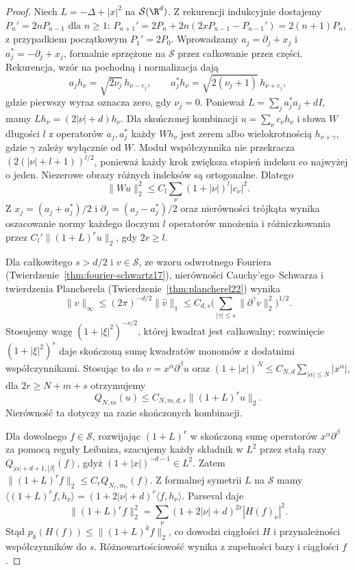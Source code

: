 \begin{proof}
Niech $L=-\Delta+|x|^2$ na $\mathcal S(\R^d)$.
Z rekurencji indukcyjnie dostajemy $P_n'=2nP_{n-1}$ dla $n\ge1$:
$P_{n+1}'=2P_n+2n(2xP_{n-1}-P_{n-1}')=2(n+1)P_n$,
z przypadkiem początkowym $P_1'=2P_0$.
Wprowadzamy $a_j=\partial_j+x_j$ i $a_j^*=-\partial_j+x_j$,
formalnie sprzężone na $\mathcal S$ przez całkowanie przez części.
Rekurencja, wzór na pochodną i normalizacja dają
\[
 a_jh_\nu=\sqrt{2\nu_j}\,h_{\nu-e_j},\qquad
 a_j^*h_\nu=\sqrt{2(\nu_j+1)}\,h_{\nu+e_j},
\]
gdzie pierwszy wyraz oznacza zero, gdy $\nu_j=0$.
Ponieważ $L=\sum_j a_j^*a_j+dI$, mamy
$Lh_\nu=(2|\nu|+d)h_\nu$.
Dla skończonej kombinacji $u=\sum_\nu c_\nu h_\nu$
i słowa $W$ długości $l$ z operatorów $a_j,a_j^*$
każdy $Wh_\nu$ jest zerem albo wielokrotnością
$h_{\nu+\gamma}$, gdzie $\gamma$ zależy wyłącznie od $W$.
Moduł współczynnika nie przekracza
$(2(|\nu|+l+1))^{l/2}$, ponieważ każdy krok zwiększa
stopień indeksu co najwyżej o jeden.
Niezerowe obrazy różnych indeksów są ortogonalne.
Dlatego
\[
 \|Wu\|_2^2\le C_l\sum_\nu(1+|\nu|)^l|c_\nu|^2.
\]
Z $x_j=(a_j+a_j^*)/2$ i $\partial_j=(a_j-a_j^*)/2$
oraz nierówności trójkąta wynika oszacowanie normy
każdego iloczynu $l$ operatorów mnożenia i różniczkowania
przez $C_l'\|(1+L)^r u\|_2$, gdy $2r\ge l$.

Dla całkowitego $s>d/2$ i $v\in\mathcal S$, ze wzoru
odwrotnego Fouriera (Twierdzenie~\ref{thm:fourier-schwartz17}),
nierówności Cauchy'ego--Schwarza i twierdzenia
Plancherela (Twierdzenie~\ref{thm:plancherel22}) wynika
\[
 \|v\|_\infty\le (2\pi)^{-d/2}\|\widehat v\|_1
 \le C_{d,s}\Big(\sum_{|\gamma|\le s}
 \|\partial^\gamma v\|_2^2\Big)^{1/2}.
\]
Stosujemy wagę $(1+|\xi|^2)^{-s/2}$, której kwadrat
jest całkowalny; rozwinięcie $(1+|\xi|^2)^s$ daje
skończoną sumę kwadratów monomów z dodatnimi współczynnikami.
Stosując to do $v=x^\alpha\partial^\beta u$ oraz
$(1+|x|)^N\le C_{N,d}\sum_{|\alpha|\le N}|x^\alpha|$,
dla $2r\ge N+m+s$ otrzymujemy
\[
 Q_{N,m}(u)\le C_{N,m,d,s}\|(1+L)^r u\|_2.
\]
Nierówność ta dotyczy na razie skończonych kombinacji.

Dla dowolnego $f\in\mathcal S$, rozwijając $(1+L)^r$
w skończoną sumę operatorów $x^\alpha\partial^\beta$
za pomocą reguły Leibniza, szacujemy każdy składnik
w $L^2$ przez stałą razy $Q_{|\alpha|+d+1,|\beta|}(f)$,
gdyż $(1+|x|)^{-d-1}\in L^2$.
Zatem $\|(1+L)^r f\|_2\le C_r Q_{N_r,m_r}(f)$.
Z formalnej symetrii $L$ na $\mathcal S$ mamy
$\langle(1+L)^r f,h_\nu\rangle
=(1+2|\nu|+d)^r\langle f,h_\nu\rangle$.
Parseval daje
\[
 \|(1+L)^r f\|_2^2
 =\sum_\nu(1+2|\nu|+d)^{2r}|H(f)_\nu|^2.
\]
Stąd $p_k(H(f))\le\|(1+L)^k f\|_2$, co dowodzi
ciągłości $H$ i przynależności współczynników do $s$.
Różnowartościowość wynika z zupełności bazy i ciągłości $f$.


\end{proof}
